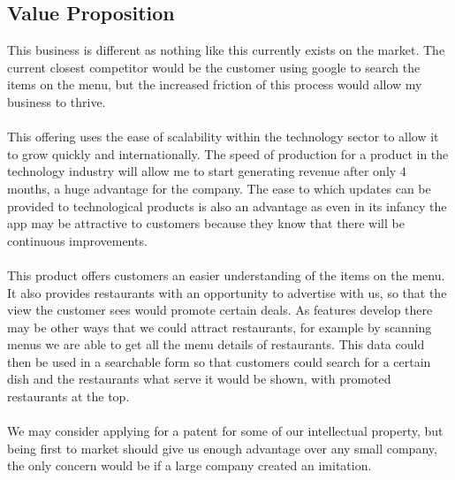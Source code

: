 \documentclass{article}[18pt]
\begin{document}
\subsection{Value Proposition}
This business is different as nothing like this currently exists on the market. The current closest competitor would be the customer using google to search the items on the menu, but the increased friction of this process would allow my business to thrive.\\
\\
This offering uses the ease of scalability within the technology sector to allow it to grow quickly and internationally. The speed of production for a product in the technology industry will allow me to start generating revenue after only 4 months, a huge advantage for the company. The ease to which updates can be provided to technological products is also an advantage as even in its infancy the app may be attractive to customers because they know that there will be continuous improvements.\\
\\
This product offers customers an easier understanding of the items on the menu. It also provides restaurants with an opportunity to advertise with us, so that the view the customer sees would promote certain deals. As features develop there may be other ways that we could attract restaurants, for example by scanning menus we are able to get all the menu details of restaurants. This data could then be used in a searchable form so that customers could search for a certain dish and the restaurants what serve it would be shown, with promoted restaurants at the top.\\
\\
We may consider applying for a patent for some of our intellectual property, but being first to market should give us enough advantage over any small company, the only concern would be if a large company created an imitation.
%
\end{document}
